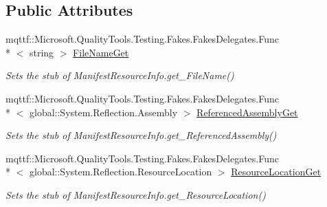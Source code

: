 \subsection*{Public Attributes}
\begin{DoxyCompactItemize}
\item 
mqttf\-::\-Microsoft.\-Quality\-Tools.\-Testing.\-Fakes.\-Fakes\-Delegates.\-Func\\*
$<$ string $>$ \hyperlink{class_system_1_1_reflection_1_1_fakes_1_1_stub_manifest_resource_info_a2b682966507355d95a41db76caa103a1}{File\-Name\-Get}
\begin{DoxyCompactList}\small\item\em Sets the stub of Manifest\-Resource\-Info.\-get\-\_\-\-File\-Name()\end{DoxyCompactList}\item 
mqttf\-::\-Microsoft.\-Quality\-Tools.\-Testing.\-Fakes.\-Fakes\-Delegates.\-Func\\*
$<$ global\-::\-System.\-Reflection.\-Assembly $>$ \hyperlink{class_system_1_1_reflection_1_1_fakes_1_1_stub_manifest_resource_info_a6bfa3212b8077c2c225d0d89054f5683}{Referenced\-Assembly\-Get}
\begin{DoxyCompactList}\small\item\em Sets the stub of Manifest\-Resource\-Info.\-get\-\_\-\-Referenced\-Assembly()\end{DoxyCompactList}\item 
mqttf\-::\-Microsoft.\-Quality\-Tools.\-Testing.\-Fakes.\-Fakes\-Delegates.\-Func\\*
$<$ global\-::\-System.\-Reflection.\-Resource\-Location $>$ \hyperlink{class_system_1_1_reflection_1_1_fakes_1_1_stub_manifest_resource_info_ab93490935b8e1e6b0bed3db240453097}{Resource\-Location\-Get}
\begin{DoxyCompactList}\small\item\em Sets the stub of Manifest\-Resource\-Info.\-get\-\_\-\-Resource\-Location()\end{DoxyCompactList}\end{DoxyCompactItemize}
